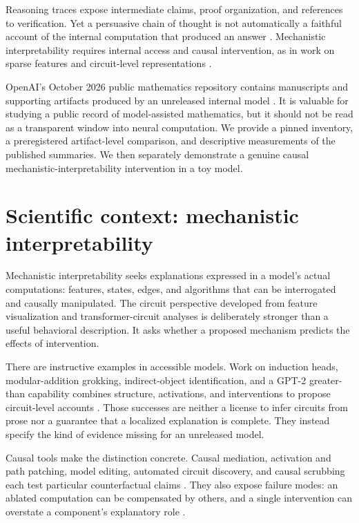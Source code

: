 \documentclass[11pt]{article}
\begin{document}
Reasoning traces expose intermediate claims, proof organization, and references
to verification. Yet a persuasive chain of thought is not automatically a
faithful account of the internal computation that produced an answer
\citep{turpin2023language,lanham2023measuring}. Mechanistic interpretability
requires internal access and causal intervention, as in work on sparse features
and circuit-level representations \citep{elhage2022toy,templeton2024scaling}.

OpenAI's October 2026 public mathematics repository contains manuscripts and
supporting artifacts produced by an unreleased internal model
\citep{openai2026math,openai2026announcement}. It is valuable for studying a
public record of model-assisted mathematics, but it should not be read as a
transparent window into neural computation. We provide a pinned inventory,
a preregistered artifact-level comparison, and descriptive measurements of
the published summaries. We then separately demonstrate a genuine causal
mechanistic-interpretability intervention in a toy model.

\section{Scientific context: mechanistic interpretability}

Mechanistic interpretability seeks explanations expressed in a model's actual
computations: features, states, edges, and algorithms that can be
interrogated and causally manipulated. The circuit perspective developed from
feature visualization and transformer-circuit analyses
\citep{olah2018building,olah2020zoom,elhage2021framework} is deliberately
stronger than a useful behavioral description. It asks whether a proposed
mechanism predicts the effects of intervention.

There are instructive examples in accessible models. Work on induction heads,
modular-addition grokking, indirect-object identification, and a GPT-2
greater-than capability combines structure, activations, and interventions to
propose circuit-level accounts
\citep{olsson2022induction,nanda2023grokking,wang2023ioi,hanna2023greaterthan}.
Those successes are neither a license to infer circuits from prose nor a
guarantee that a localized explanation is complete. They instead specify the
kind of evidence missing for an unreleased model.

Causal tools make the distinction concrete. Causal mediation, activation and
path patching, model editing, automated circuit discovery, and causal
scrubbing each test particular counterfactual claims
\citep{vig2020causal,meng2022rome,geiger2025causal,zhang2023patching,goldowskydill2023path,conmy2023acdc,chan2022causal}.
They also expose failure modes: an ablated computation can be compensated by
others, and a single intervention can overstate a component's explanatory
role \citep{mcgrath2023hydra,finlayson2021causal,bau2019neurons}.
\end{document}
